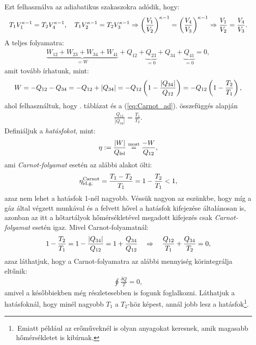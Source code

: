 Ezt felhasználva az adiabatikus szakaszokra adódik, hogy:
\begin{align}\label{eq:Carnot_ad}
	T_1V_1^{\kappa-1}=T_2V_4^{\kappa-1},\quad T_1V_2^{\kappa-1}=T_2V_3^{\kappa-1} \Rightarrow \left({\frac{V_1}{V_2}}\right)^{\kappa-1} = \left({\frac{V_4}{V_3}}\right)^{\kappa-1} \Rightarrow \frac{V_1}{V_2}=\frac{V_4}{V_3}.
\end{align}
A teljes folyamatra:
\begin{align}
	\underbrace{W_{12}+W_{23}+W_{34}+W_{41}}_{=W}+Q_{12}+\underbrace{Q_{23}}_{=0}+Q_{34}+\underbrace{Q_{41}}_{=0} = 0,
\end{align}
amit tovább írhatunk, mint:
\begin{align}
	W=-Q_{12}-Q_{34} = -Q_{12}+|Q_{34}| = -Q_{12}\left({1-\frac{|Q_{34}|}{Q_{12}}}\right) = -Q_{12}\left({1-\frac{T_2}{T_1}}\right),
\end{align}
ahol felhasználtuk, hogy . táblázat és a (\ref{eq:Carnot_ad}). összefüggés alapján
\begin{align}
	\frac{Q_{12}}{|Q_{34}|} = \frac{T_1}{T_2}.
\end{align}
Definiáljuk a \emph{hatásfokot}, mint:
\begin{align}
	\eta := \frac{|W|}{Q_{\textnormal{fel}}} \stackrel{\textnormal{most}}{=} \frac{-W}{Q_{12}},
\end{align}
ami \emph{Carnot-folyamat} esetén az alábbi alakot ölti:
\begin{align}
	\eta_{\textnormal{id.g.}}^{\textnormal{Carnot}}= \frac{T_1-T_2}{T_1} = 1-\frac{T_2}{T_1}<1,
\end{align}
azaz nem lehet a hatásfok 1-nél nagyobb.
Véssük nagyon az eszünkbe, hogy míg a gáz által végzett munkával és a felvett hővel a hatásfok kifejezése általánosan is, azonban az itt a hőtartályok hőmérsékletével megadott kifejezés csak \emph{Carnot-folyamat} esetén igaz.
Mivel Carnot-folyamatnál:
\begin{align}\label{eq:Carnot_S}
	1-\frac{T_2}{T_1} = 1-\frac{|Q_{34}|}{Q_{12}} = 1+\frac{Q_{34}}{Q_{12}}\quad\Rightarrow\quad \frac{Q_{12}}{T_1}+\frac{Q_{34}}{T_2} = 0,
\end{align}
azaz láthatjuk, hogy a Carnot-folyamatra az alábbi mennyiség körintegrálja eltűnik:
\begin{align}
	\oint \frac{\delta Q}{T} = 0,
\end{align}
amivel a későbbiekben még részletesebben is fogunk foglalkozni.
Láthatjuk a hatásfoknál, hogy minél nagyobb $T_1$ a $T_2$-höz képest, annál jobb lesz a hatásfok\footnote{\,Emiatt például az erőműveknél is olyan anyagokat keresnek, amik magasabb hőmérsékletet is kibírnak.}.
